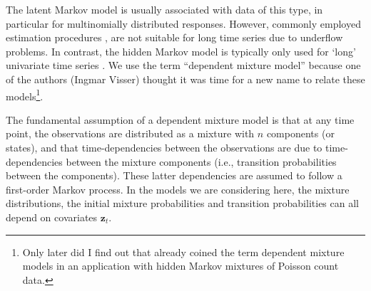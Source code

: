 \documentclass[article]{jss}
\newcommand{\vc}{\mathbf}
\newcommand{\greekv}[1]{\mbox{\boldmath$\mathrm{#1}$}}
\begin{document}
The latent Markov model is usually associated with data of this type,
in particular for multinomially distributed responses.  However,
commonly employed estimation procedures \citep[e.g.,][]{Pol1996}, are
not suitable for long time series due to underflow problems.  In
contrast, the hidden Markov model is typically only used for `long'
univariate time series \citep[][chapter~1]{Cappe2005}.  We use the
term ``dependent mixture model'' because one of the authors (Ingmar
Visser) thought it was time for a new name to relate these
models\footnote{Only later did I find out that \citet{Leroux1992}
already coined the term dependent mixture models in an application
with hidden Markov mixtures of Poisson count data.}.

The fundamental assumption of a dependent mixture model is that at any
time point, the observations are distributed as a mixture with $n$
components (or states), and that time-dependencies between the
observations are due to time-dependencies between the mixture
components (i.e., transition probabilities between the components).
These latter dependencies are assumed to follow a first-order Markov
process.  In the models we are considering here, the mixture
distributions, the initial mixture probabilities and transition
probabilities can all depend on covariates $\vc{z}_t$.

\end{document}

